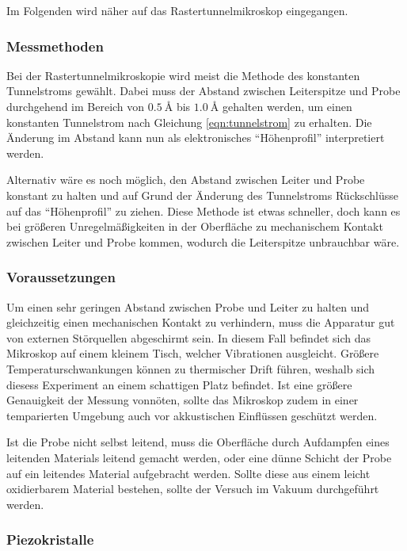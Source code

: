 Im Folgenden wird näher auf das Rastertunnelmikroskop eingegangen.

\subsubsection{Messmethoden} %
\label{ssub:messmethoden}

Bei der Rastertunnelmikroskopie wird meist die Methode des konstanten Tunnelstroms gewählt.
Dabei muss der Abstand zwischen Leiterspitze und Probe durchgehend im Bereich von $\SI{0,5}{\angstrom}$ bis $\SI{1,0}{\angstrom}$ gehalten werden, um einen konstanten Tunnelstrom nach Gleichung \ref{eqn:tunnelstrom} zu erhalten.
Die Änderung im Abstand kann nun als elektronisches "`Höhenprofil"' interpretiert werden.

Alternativ wäre es noch möglich, den Abstand zwischen Leiter und Probe konstant zu halten und auf Grund der Änderung des Tunnelstroms Rückschlüsse auf das "`Höhenprofil"' zu ziehen.
Diese Methode ist etwas schneller, doch kann es bei größeren Unregelmäßigkeiten in der Oberfläche zu mechanischem Kontakt zwischen Leiter und Probe kommen, wodurch die Leiterspitze unbrauchbar wäre.

\subsubsection{Voraussetzungen} %
\label{ssub:voraussetzungen}

Um einen sehr geringen Abstand zwischen Probe und Leiter zu halten und gleichzeitig einen mechanischen Kontakt zu verhindern, muss die Apparatur gut von externen Störquellen abgeschirmt sein.
In diesem Fall befindet sich das Mikroskop auf einem kleinem Tisch, welcher Vibrationen ausgleicht.
Größere Temperaturschwankungen können zu thermischer Drift führen, weshalb sich diesess Experiment an einem schattigen Platz befindet.
Ist eine größere Genauigkeit der Messung vonnöten, sollte das Mikroskop zudem in einer temparierten Umgebung auch vor akkustischen Einflüssen geschützt werden.

Ist die Probe nicht selbst leitend, muss die Oberfläche durch Aufdampfen eines leitenden Materials leitend gemacht werden, oder eine dünne Schicht der Probe auf
ein leitendes Material aufgebracht werden.
Sollte diese aus einem leicht oxidierbarem Material bestehen, sollte der Versuch im Vakuum durchgeführt werden.

\subsubsection{Piezokristalle} %
\label{ssub:piezokristalle}

